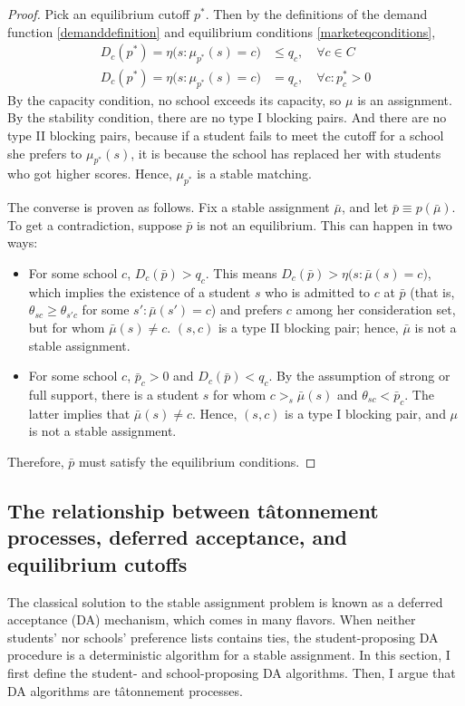 \documentclass[12pt]{article}
\theoremstyle{definition}
\begin{document}
\begin{proof}Pick an equilibrium cutoff $p^*$. Then by the definitions of the demand function \eqref{demanddefinition} and equilibrium conditions \eqref{marketeqconditions}, 
\begin{align*}
D_c(p^*) = \eta\bigl(s: \mu_{p^*}(s) = c\bigr) &\leq q_c, \quad\forall c \in C \\
D_c(p^*) = \eta\bigl(s: \mu_{p^*}(s) = c\bigr) &= q_c, \quad \forall c: p_c^* > 0 
\end{align*}
By the capacity condition, no school exceeds its capacity, so $\mu$ is an assignment. By the stability condition, there are no type I blocking pairs. And there are no type II blocking pairs, because if a student fails to meet the cutoff for a school she prefers to $\mu_{p^*}(s)$, it is because the school has replaced her with students who got higher scores. Hence, $\mu_{p^*}$ is a stable matching.

The converse is proven as follows. Fix a stable assignment $\bar \mu$, and let $\bar p \equiv p(\bar \mu)$. To get a contradiction, suppose $\bar p$ is not an equilibrium. This can happen in two ways:
\begin{itemize}
\item For some school $c$, $D_c( \bar p) > q_c$. This means $D_c( \bar p)  >  \eta\bigl(s: \bar \mu(s) = c\bigr) $, which implies the existence of a student  $s$ who is admitted to $c$ at $\bar p$ (that is, $\theta_{sc} \geq \theta_{s'c}$ for some $s': \bar \mu(s') = c$) and prefers $c$ among her consideration set, but for whom $\bar \mu(s) \neq c$. $(s, c)$ is a type II blocking pair; hence, $\bar \mu$ is not a stable assignment.
\item For some school $c$, $\bar p_c > 0$ and $D_c(\bar p) < q_c$. By the assumption of strong or full support, there is a student $s$ for whom $c >_s \bar \mu(s)$ and $\theta_{sc} < \bar p_c$. The latter implies that $\bar \mu(s) \neq c$. Hence, $(s, c)$ is a type I blocking pair, and $\mu$ is not a stable assignment. 
\end{itemize}
Therefore, $\bar p$ must satisfy the equilibrium conditions.
\end{proof}

\subsection{The relationship between t\^{atonnement} processes, deferred acceptance, and equilibrium cutoffs}

The classical solution to the stable assignment problem is known as a deferred acceptance (DA) mechanism, which comes in many flavors. When neither students' nor schools' preference lists contains ties, the student-proposing DA procedure is a deterministic algorithm for a stable assignment.  In this section, I first define the student- and school-proposing DA algorithms. Then, I argue that DA algorithms are t\^{a}tonnement processes.
\end{document}
